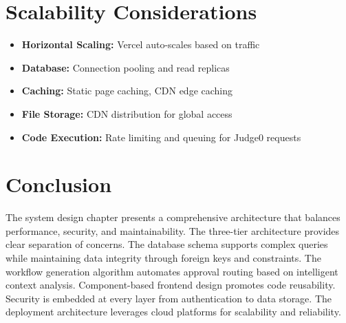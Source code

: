 \section{Scalability Considerations}

\begin{itemize}
\item \textbf{Horizontal Scaling:} Vercel auto-scales based on traffic
\item \textbf{Database:} Connection pooling and read replicas
\item \textbf{Caching:} Static page caching, CDN edge caching
\item \textbf{File Storage:} CDN distribution for global access
\item \textbf{Code Execution:} Rate limiting and queuing for Judge0 requests
\end{itemize}

\section{Conclusion}

The system design chapter presents a comprehensive architecture that balances performance, security, and maintainability. The three-tier architecture provides clear separation of concerns. The database schema supports complex queries while maintaining data integrity through foreign keys and constraints. The workflow generation algorithm automates approval routing based on intelligent context analysis. Component-based frontend design promotes code reusability. Security is embedded at every layer from authentication to data storage. The deployment architecture leverages cloud platforms for scalability and reliability.

\newpage
